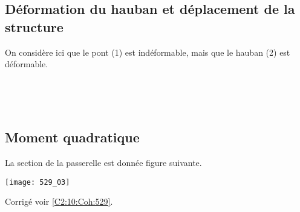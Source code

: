 \subsection*{Déformation du hauban et déplacement de la structure}
On considère ici que le pont (1) est indéformable, mais que le hauban (2) est déformable. 

\ifprof
\begin{corrige}~\\
\end{corrige}
\else
\fi

\ifprof
\begin{corrige}~\\
\end{corrige}
\else
\fi

\subsection*{Moment quadratique}
La section de la passerelle est donnée figure suivante. 
\begin{marginfigure}
\texttt{[image: 529\_03]}

\end{marginfigure}





\ifprof
\else
\begin{flushright}
\footnotesize{Corrigé  voir \ref{C2:10:Coh:529}.}
\end{flushright}%
\fi

